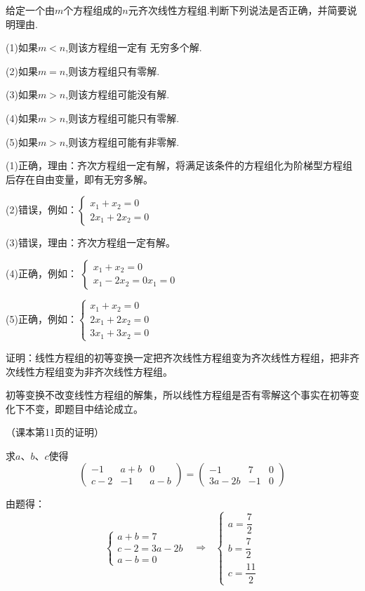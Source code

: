 \documentclass[a4paper]{report}
\begin{document}
\EX 给定一个由$m$个方程组成的$n$元齐次线性方程组.判断下列说法是否正确，并简要说明理由.

(1)如果$m< n$,则该方程组一定有 无穷多个解.

(2)如果$m=n$,则该方程组只有零解.

(3)如果$m>n$,则该方程组可能没有解.

(4)如果$m> n$,则该方程组可能只有零解.

(5)如果$m> n$,则该方程组可能有非零解.

\begin{jie}
(1)正确，理由：齐次方程组一定有解，将满足该条件的方程组化为阶梯型方程组后存在自由变量，即有无穷多解。

(2)错误，例如：$
\begin{cases}
x_1+x_2=0\\
2x_1+2x_2=0
\end{cases}
$

(3)错误，理由：齐次方程组一定有解。

(4)正确，例如：
$
\begin{cases}
x_1+x_2=0\\
x_1-2x_2=0
x_1=0
\end{cases}
$

(5)正确，例如：$
\begin{cases}
x_1+x_2=0\\
2x_1+2x_2=0\\
3x_1+3x_2=0
\end{cases}
$
\end{jie}

\EX 证明：线性方程组的初等变换一定把齐次线性方程组变为齐次线性方程组，把非齐次线性方程组变为非齐次线性方程组。
\begin{zhengming}
初等变换不改变线性方程组的解集，所以线性方程组是否有零解这个事实在初等变化下不变，即题目中结论成立。

（课本第11页的证明）
\end{zhengming}

\EX 求$a$、$b$、$c$使得
\begin{equation*}
\begin{pmatrix}
-1&a+b&0\\ c-2&-1&a-b
\end{pmatrix}=\begin{pmatrix}
-1&7&0\\ 3a-2b&-1&0
\end{pmatrix}
\end{equation*}

\begin{jie}
由题得：
\begin{equation*}
\begin{cases}
a+b=7\\
c-2=3a-2b\\
a-b=0
\end{cases}~~~\Rightarrow~~~
\begin{cases}
a=\dfrac{7}{2}\\
b=\dfrac{7}{2}\\
c=\dfrac{11}{2}
\end{cases}
\end{equation*}
\end{jie}
\end{document}
